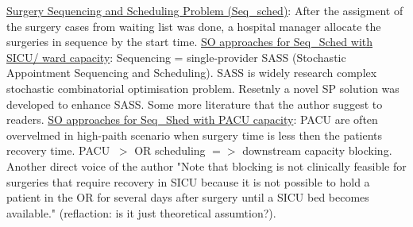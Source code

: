     \underline{Surgery Sequencing and Scheduling Problem (Seq\_sched)}: After the assigment of the surgery cases from waiting list was done, a hospital manager allocate the surgeries in sequence by the start time. \underline{SO approaches for Seq\_Sched with SICU/ ward capacity}: Sequencing = single-provider SASS (Stochastic Appointment Sequencing and Scheduling). SASS is widely research complex stochastic combinatorial optimisation problem. Resetnly a novel SP solution was developed to enhance SASS. Some more literature that the author suggest to readers. \underline{SO approaches for Seq\_Shed with PACU capacity}: PACU are often overvelmed in high-paith scenario when surgery time is less then the patients recovery time. PACU $~>$ OR scheduling $=>$ downstream capacity blocking. Another direct voice of the author "Note that blocking is not clinically feasible for surgeries that require recovery in SICU because it is not possible to hold a patient in the OR for several days after surgery until a SICU bed becomes available." (reflaction: is it just theoretical assumtion?).
    
